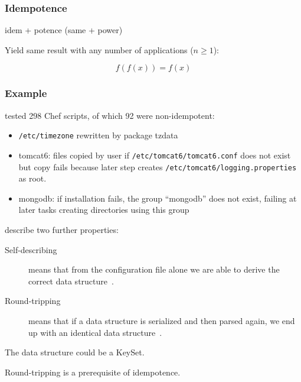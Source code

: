 \begin{frame}
	\frametitle{Idempotence}

	idem + potence (same + power)
	\vspace{2em}

	Yield same result with any number of applications ($n\ge1$):
		
	\[
		f(f(x))=f(x)
	\]
\end{frame}

\begin{frame}
	\frametitle{Example}
	\citet{waldemar2013testing} tested 298 Chef scripts, of which 92 were non-idempotent:

	\begin{itemize}[<+-| alert@+>]
	\item \texttt{/etc/timezone} rewritten by package tzdata
	\item tomcat6: files copied by user if \texttt{/etc/tomcat6/tomcat6.conf} does not exist but copy fails because later step creates \texttt{/etc/tomcat6/logging.properties} as root.
	\item mongodb: if installation fails, the group ``mongodb'' does not exist, failing at later tasks creating directories using this group
	\end{itemize}
\end{frame}

\begin{frame}
	\citet{wadler2003xml} describe two further properties:
	\vspace{2em}

	\begin{description}
	\item[Self-describing]
	means that from the configuration file alone we are able to derive the correct data structure~\cite{wadler2003xml}.

	\item[Round-tripping]
	means that if a data structure is serialized and then parsed again, we end up with an identical data structure~\cite{wadler2003xml}.
	\end{description}

	The data structure could be a KeySet.

	\pause

	\vspace{2em}
	Round-tripping is a prerequisite of idempotence.
\end{frame}


